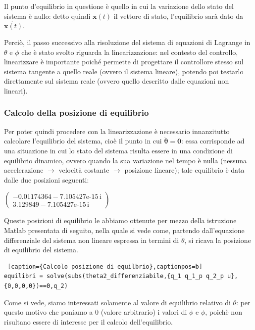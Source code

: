 Il punto d'equilibrio in questione è quello in cui la variazione dello stato del sistema è nullo: detto quindi $\mathbf{x}(t)$ il vettore di stato, l'equilibrio sarà dato da $\dot{\mathbf{x}(t)}$.

Perciò, il passo successivo alla risoluzione del sistema di equazioni di Lagrange in $\theta$ e $\phi$ che è stato svolto riguarda la linearizzazione: nel contesto del controllo, linearizzare è importante poiché permette di progettare il controllore stesso sul sistema tangente a quello reale (ovvero il sistema lineare), potendo poi testarlo direttamente sul sistema reale (ovvero quello descritto dalle equazioni non lineari).

\subsubsection{Calcolo della posizione di equilibrio}
Per poter quindi procedere con la linearizzazione è necessario innanzitutto calcolare l'equilibrio del sistema, cioè il punto in cui $\mathbf{\ddot{\theta} = 0}$: essa corrisponde  ad una situazione in cui lo stato del sistema risulta essere in una condizione di equilibrio dinamico, ovvero quando la sua variazione nel tempo è nulla (nessuna accelerazione $\rightarrow$ velocità costante $\rightarrow$ posizione lineare); tale equilibrio è data dalle due posizioni seguenti:
\begin{center}
	$\left(\begin{array}{c}
		-0.01174364-\text{7.105427e-15}\,\mathrm{i}\\
		3.129849-\text{7.105427e-15}\,\mathrm{i}
	\end{array}\right)$
\end{center}

Queste posizioni di equilibrio le abbiamo ottenute per mezzo della istruzione Matlab presentata di seguito, nella quale si vede come, partendo dall'equazione differenziale del sistema non lineare espressa in termini di $\ddot{\theta}$, si ricava la posizione di equilibrio del sistema.
\begin{lstlisting} [caption={Calcolo posizione di equilbrio},captionpos=b]
equilibri = solve(subs(theta2_differenziabile,{q_1 q_1_p q_2_p u},{0,0,0,0})==0,q_2)
\end{lstlisting}

Come si vede, siamo interessati solamente al valore di equilibrio relativo di $\theta$: per questo motivo che poniamo a 0 (valore arbitrario) i valori di $\phi$ e $\dot{\phi}$, poichè non risultano essere di interesse per il calcolo dell'equilibrio.

